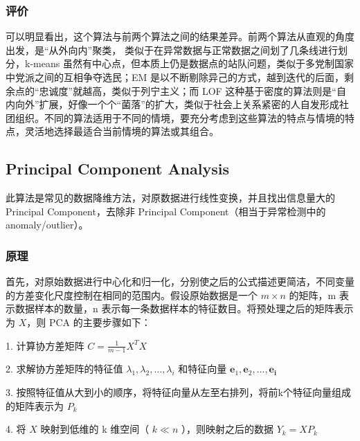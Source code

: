 \documentclass[UTF8]{ctexart}
\begin{document}
        \subsubsection{评价}
            可以明显看出，这个算法与前两个算法之间的结果差异。前两个算法从直观的角度出发，是“从外向内”聚类， 类似于在异常数据与正常数据之间划了几条线进行划分，k-means 虽然有中心点，但本质上仍是数据点的站队问题，类似于多党制国家中党派之间的互相争夺选民；EM 是以不断剔除异己的方式，越到迭代的后面，剩余点的“忠诚度”就越高，类似于列宁主义；而 LOF 这种基于密度的算法则是“自内向外”扩展，好像一个个“菌落”的扩大，类似于社会上关系紧密的人自发形成社团组织。不同的算法适用于不同的情境，要充分考虑到这些算法的特点与情境的特点，灵活地选择最适合当前情境的算法或其组合。

    \subsection{Principal Component Analysis}
    此算法是常见的数据降维方法，对原数据进行线性变换，并且找出信息量大的 Principal Component，去除非 Principal Component（相当于异常检测中的 anomaly/outlier）。
        \subsubsection{原理}
        首先，对原始数据进行中心化和归一化，分别使之后的公式描述更简洁，不同变量的方差变化尺度控制在相同的范围内。假设原始数据是一个 \( m \times n\) 的矩阵，m 表示数据样本的数量，n 表示每一条数据样本的特征数目。将预处理之后的矩阵表示为 \(X\)，则 PCA 的主要步骤如下：

        1. 计算协方差矩阵 \(C=\frac{1}{m-1} X^{T} X\)
        
        2. 求解协方差矩阵的特征值 \(\lambda_{1}, \lambda_{2}, \ldots, \lambda_{i}\) 和特征向量 \(\mathbf{e}_{1}, \mathbf{e}_{2}, \ldots, \mathbf{e}_{\mathbf{i}}\)

        3. 按照特征值从大到小的顺序，将特征向量从左至右排列，将前k个特征向量组成的矩阵表示为 \(P_{k}\)

        4. 将 \(X\) 映射到低维的 k 维空间（ \(k \ll n\) ），则映射之后的数据 \(Y_{k}=X P_{k}\)
\end{document}
